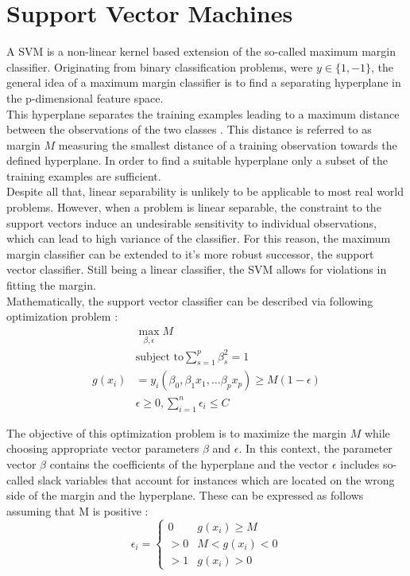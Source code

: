 \section{Support Vector Machines}

A SVM is a non-linear kernel based extension of the so-called maximum margin classifier. Originating from binary classification problems, were $y \in \{1, -1\}$, the general idea of a maximum margin classifier is to find a separating hyperplane in the p-dimensional feature space. \\

This hyperplane separates the training examples leading to a maximum distance between the observations of the two classes \cite{James:2014:ISL:2517747}. This distance is referred to as margin $M$ measuring the smallest distance of a training observation towards the defined hyperplane. In order to find a suitable hyperplane only a subset of the training examples are sufficient.\\

Despite all that, linear separability is unlikely to be applicable to most real world problems. However, when a problem is linear separable, the constraint to the support vectors induce an undesirable sensitivity to individual observations, which can lead to high variance of the classifier. For this reason, the maximum margin classifier can be extended to it's more robust successor, the support vector classifier. Still being a linear classifier, the SVM allows for violations in fitting the margin. \\

Mathematically, the support vector classifier can be described via following optimization problem \cite{James:2014:ISL:2517747}:
\begin{eqnarray}
  & \max_{\beta, \epsilon} M \\
  & \textrm{subject to} \sum_{s=1}^{p} \beta^2_s = 1 \\
  g(x_{i}) &= y_i(\beta_0, \beta_1 x_1, \dots \beta_p x_p) \geq M(1 - \epsilon) \\
  & \epsilon \geq 0, \sum_{i=1}^n \epsilon_i \leq C
\end{eqnarray}

The objective of this optimization problem is to maximize the margin $M$ while choosing appropriate vector parameters $\beta$ and $\epsilon$. In this context, the parameter vector $\beta$ contains the coefficients of the hyperplane and the vector $\epsilon$ includes so-called slack variables that account for instances which are located on the wrong side of the margin and the hyperplane. These can be expressed as follows assuming that M is positive \cite{James:2014:ISL:2517747}:
\begin{equation}
  \epsilon_i =
  \begin{cases}
    0 & g(x_i) \geq M \\
    > 0 & M < g(x_i) < 0 \\
    > 1 & g(x_i) > 0 
  \end{cases}
\end{equation}

